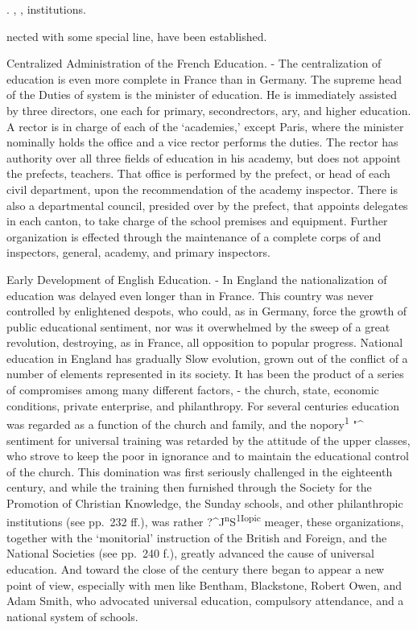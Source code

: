 \documentclass[
]{book}
\begin{document}
. , , institutions.

nected with some special line, have been established.

Centralized Administration of the French Education. - The centralization of education is even more complete in France than in Germany. The supreme head of the\protect\hypertarget{ch25.xmlux5cux23para.463.1.0.box.95.217.1263.802.q.60}{}{ Duties of system is the minister of education. He is immediately assisted by three directors, one each for primary, secondrectors, ary, and higher education. A rector is in charge of each of the `academies,' except Paris, where the minister nominally holds the office and a vice rector performs the duties. The rector has authority over all three fields of education in his academy, but does not appoint the prefects, teachers. That office is performed by the prefect, or head of each civil department, upon the recommendation of the academy inspector. There is also a departmental council, presided over by the prefect, that appoints delegates in each canton, to take charge of the school premises and equipment. Further organization is effected through the maintenance of a complete corps of and inspectors, general, academy, and primary inspectors.}

Early Development of English Education. - In England the nationalization of education was delayed even longer than in France. This country was never controlled by enlightened despots, who could, as in Germany, force the growth of public educational sentiment, nor was it overwhelmed by the sweep of a great revolution, destroying, as in France, all opposition to popular progress. National education in England has gradually Slow evolution, grown out of the conflict of a number of elements represented in its society. It has been the product of a series of compromises among many different factors, - the church, state, economic conditions, private enterprise, and philanthropy. For several centuries education was regarded as a function of the church and family, and the nopory\textsuperscript{1} "\^{} sentiment for universal training was retarded by the attitude of the upper classes, who strove to keep the poor in ignorance and to maintain the educational control\protect\hypertarget{ch25.xmlux5cux23para.464.1.0.box.98.226.1243.738.q.60}{}{ of the church. This domination was first seriously challenged in the eighteenth century, and while the training then furnished through the Society for the Promotion of Christian Knowledge, the Sunday schools, and other philanthropic institutions (see pp.~232 ff.), was rather ?\^{}J\textsuperscript{n}S\textsuperscript{1Iopic} meager, these organizations, together with the `monitorial' instruction of the British and Foreign, and the National Societies (see pp.~240 f.), greatly advanced the cause of universal education. And toward the close of the century there began to appear a new point of view, especially with men like Bentham, Blackstone, Robert Owen, and Adam Smith, who advocated universal education, compulsory attendance, and a national system of schools.}
\end{document}
